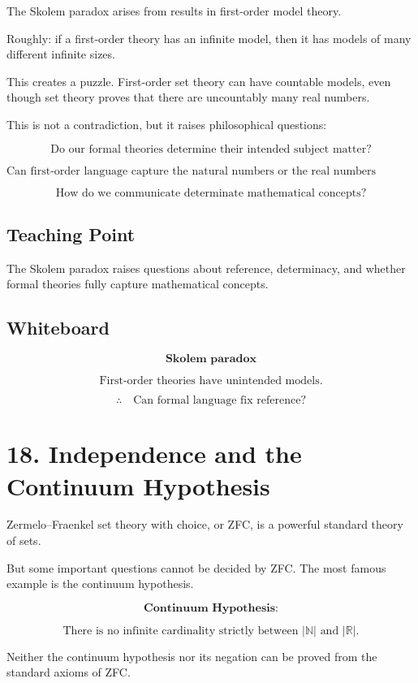 \documentclass[11pt]{article}
\begin{document}
The Skolem paradox arises from results in first-order model theory.

Roughly: if a first-order theory has an infinite model, then it has models of many different
infinite sizes.

This creates a puzzle. First-order set theory can have countable models, even though set
theory proves that there are uncountably many real numbers.

This is not a contradiction, but it raises philosophical questions:

\[
\text{Do our formal theories determine their intended subject matter?}
\]

\[
\text{Can first-order language capture the natural numbers or the real numbers uniquely?}
\]

\[
\text{How do we communicate determinate mathematical concepts?}
\]

\subsection*{Teaching Point}

The Skolem paradox raises questions about reference, determinacy, and whether formal
theories fully capture mathematical concepts.

\subsection*{Whiteboard}

\[
\textbf{Skolem paradox}
\]

\[
\text{First-order theories have unintended models.}
\]

\[
\therefore \quad
\text{Can formal language fix reference?}
\]

\section*{18. Independence and the Continuum Hypothesis}

Zermelo--Fraenkel set theory with choice, or ZFC, is a powerful standard theory of sets.

But some important questions cannot be decided by ZFC. The most famous example is the
continuum hypothesis.

\[
\textbf{Continuum Hypothesis:}
\]

\[
\text{There is no infinite cardinality strictly between } |\mathbb{N}| \text{ and } |\mathbb{R}|.
\]

Neither the continuum hypothesis nor its negation can be proved from the standard
axioms of ZFC.
\end{document}
